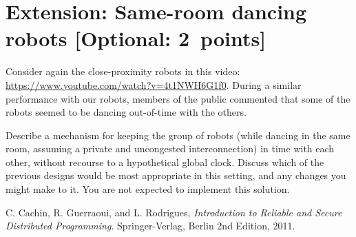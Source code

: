 \documentclass[a4paper]{article}
\begin{document}






\section*{Extension: Same-room dancing robots [Optional: 2~points]} %
\label{sec:extension_same_room_dancing_robots}

Consider again the close-proximity robots in this video:
\url{https://www.youtube.com/watch?v=4t1NWH6G1f0}. During a similar
performance with our robots, members of the public commented that some of the
robots seemed to be dancing out-of-time with the others.

Describe a mechanism for keeping the group of robots (while dancing in the
same room, assuming a private and uncongested interconnection) in time with
each other, without recourse to a hypothetical global clock. Discuss which of
the previous designs would be most appropriate in this setting, and any
changes you might make to it. You are not expected to implement this solution.



















\begin{thebibliography}{9}

  C. Cachin, R. Guerraoui, and L. Rodrigues,
  \emph{Introduction to Reliable and Secure Distributed Programming}.
  Springer-Verlag, Berlin
  2nd Edition,
  2011.

\end{thebibliography}
\end{document}
